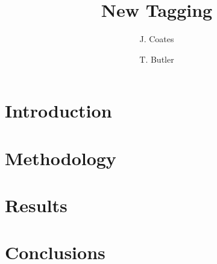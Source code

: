 \documentclass[11pt,a4paper]{article}
\title{New Tagging}
\author[1]{J. Coates}
\author[1]{T. Butler}
\affil[1]{Institute for Advanced Sustainability Studies, Potsdam, Germany}
\begin{document}
\maketitle

\begin{abstract}
\end{abstract}

\section{Introduction} \label{s:introduction}
%

\section{Methodology} \label{s:methodology}


\section{Results} \label{s:results}
%

\section{Conclusions} \label{s:conclusions}
%


 
\end{document}

